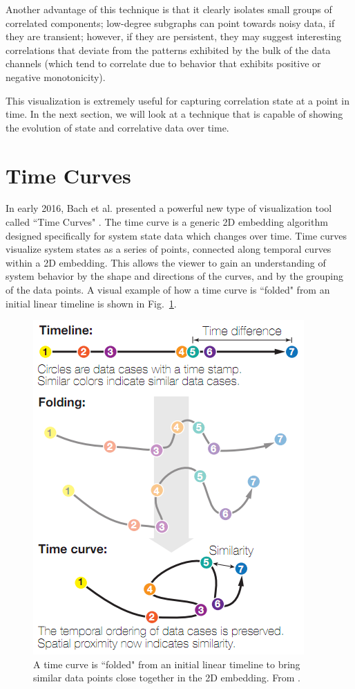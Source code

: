 Another advantage of this technique is that it clearly isolates small groups of correlated components; low-degree subgraphs can point towards noisy data, if they are transient; however, if they are persistent, they may suggest interesting correlations that deviate from the patterns exhibited by the bulk of the data channels (which tend to correlate due to behavior that exhibits positive or negative monotonicity).

This visualization is extremely useful for capturing correlation state at a point in time. In the next section, we will look at a technique that is capable of showing the evolution of state and correlative data over time.

\section{Time Curves}

In early 2016, Bach et al. presented a powerful new type of visualization tool called ``Time Curves" \cite{bach2016time}. The time curve is a generic 2D embedding algorithm designed specifically for system state data which changes over time. Time curves visualize system states as a series of points, connected along temporal curves within a 2D embedding. This allows the viewer to gain an understanding of system behavior by the shape and directions of the curves, and by the grouping of the data points. A visual example of how a time curve is ``folded" from an initial linear timeline is shown in Fig.~\ref{fig:time_curve_example}.

\begin{figure}[h]
\centering
    \includegraphics[width=0.5\columnwidth]{images/time_curve_example.png}
    \caption{A time curve is ``folded" from an initial linear timeline to bring similar data points close together in the 2D embedding. From \cite{bach2016time}.}
    \label{fig:time_curve_example}
\end{figure}

